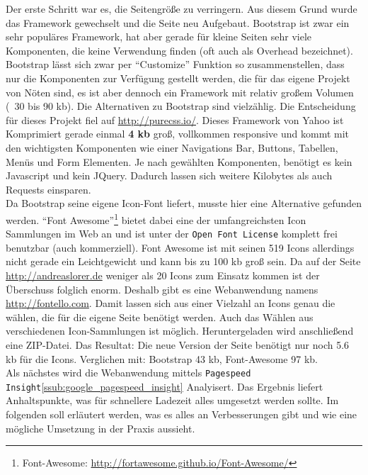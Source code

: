 		Der erste Schritt war es, die Seitengröße zu verringern. Aus diesem Grund wurde das Framework gewechselt und die Seite neu Aufgebaut. Bootstrap ist zwar ein sehr populäres Framework, hat aber gerade für kleine Seiten sehr viele Komponenten, die keine Verwendung finden (oft auch als Overhead bezeichnet). Bootstrap lässt sich zwar per "`Customize"' Funktion so zusammenstellen, dass nur die Komponenten zur Verfügung gestellt werden, die für das eigene Projekt von Nöten sind, es ist aber dennoch ein Framework mit relativ großem Volumen (~30 bis 90 kb). Die Alternativen zu Bootstrap sind vielzählig. Die Entscheidung für dieses Projekt fiel auf \url{http://purecss.io/}. Dieses Framework von Yahoo ist Komprimiert gerade einmal \textbf{4 kb} groß, vollkommen responsive und kommt mit den wichtigsten Komponenten wie einer Navigations Bar, Buttons, Tabellen, Menüs und Form Elementen. Je nach gewählten Komponenten, benötigt es kein Javascript und kein JQuery. Dadurch lassen sich weitere Kilobytes als auch Requests einsparen.\\
		Da Bootstrap seine eigene Icon-Font liefert, musste hier eine Alternative gefunden werden. "`Font Awesome"'\footnote{Font-Awesome: \url{http://fortawesome.github.io/Font-Awesome/}} bietet dabei eine der umfangreichsten Icon Sammlungen im Web an und ist unter der \texttt{Open Font License} komplett frei benutzbar (auch kommerziell). Font Awesome ist mit seinen 519 Icons allerdings nicht gerade ein Leichtgewicht und kann bis zu 100 kb groß sein. Da auf der Seite \url{http://andreaslorer.de} weniger als 20 Icons zum Einsatz kommen ist der Überschuss folglich enorm. Deshalb gibt es eine Webanwendung namens \url{http://fontello.com}. Damit lassen sich aus einer Vielzahl an Icons genau die wählen, die für die eigene Seite benötigt werden. Auch das Wählen aus verschiedenen Icon-Sammlungen ist möglich. Heruntergeladen wird anschließend eine ZIP-Datei. Das Resultat: Die neue Version der Seite benötigt nur noch 5.6 kb für die Icons. Verglichen mit: Bootstrap 43 kb, Font-Awesome 97 kb.\\

		Als nächstes wird die Webanwendung mittels \texttt{Pagespeed Insight}\ref{ssub:google_pagespeed_insight} Analyisert. Das Ergebnis liefert Anhaltspunkte, was für schnellere Ladezeit alles umgesetzt werden sollte. Im folgenden soll erläutert werden, was es alles an Verbesserungen gibt und wie eine mögliche Umsetzung in der Praxis aussieht.


